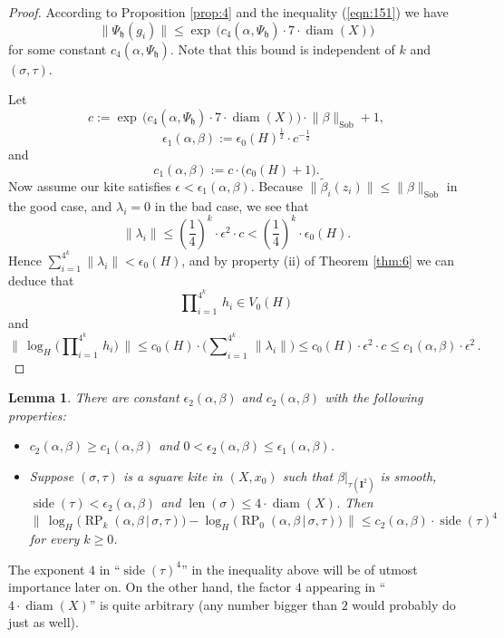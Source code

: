 \documentclass[10pt, a4paper]{amsart}
\newtheorem{lem}[equation]{Lemma}
\theoremstyle{definition}
\numberwithin{equation}{section}
\newcommand{\opn}{\operatorname}
\newcommand{\rmitem}[1]{\item[\text{\textup{(#1)}}]}
\newcommand{\mfrak}[1]{\mathfrak{#1}}
\newcommand{\mbf}[1]{\mathbf{#1}}
\newcommand{\mrm}[1]{\mathrm{#1}}
\newcommand{\smfrac}[2]{{\textstyle \frac{#1}{#2}}}
\newcommand{\til}[1]{\tilde{#1}}
\newcommand{\norm}[1]{\lVert #1 \rVert}
\newcommand{\Norm}[1]{\bigl\lVert\, #1 \, \bigr\rVert}
\renewcommand{\vert}{\, | \,}
\newcommand{\h}{\mfrak{h}}
\begin{document}
\begin{proof}
According to Proposition \ref{prop:4} and the inequality (\ref{eqn:151})
we have 
\[ \norm{\Psi_{\h}(g_i)} \leq 
\exp \, \bigl( c_4(\alpha, \Psi_{\h}) \cdot
7 \cdot \opn{diam}(X) \bigr)  \]
for some constant $c_4(\alpha, \Psi_{\h})$. Note that this bound is
independent of $k$ and $(\sigma, \tau)$.

Let
\[ c := \exp \, \bigl( c_4(\alpha, \Psi_{\h}) \cdot
7 \cdot \opn{diam}(X) \bigr) \cdot  \norm{\beta}_{\mrm{Sob}} + 1 , \]
\[ \epsilon_1(\alpha, \beta) := \epsilon_0(H)^{\smfrac{1}{2}}  
\cdot c^{-\smfrac{1}{2}}  \]
and
\[ c_1(\alpha, \beta) := c \cdot \bigl( c_0(H) + 1 \bigr) . \]
Now assume our kite satisfies $\epsilon < \epsilon_1(\alpha, \beta)$. 
Because 
$\norm{\til{\beta}_i(z_i)} \leq \norm{\beta}_{\mrm{Sob}}$
in the good case, and $\lambda_i = 0$ in the bad case, we see that 
\begin{equation*} \label{eqn:104}
\norm{\lambda_i} \leq (\smfrac{1}{4})^k \cdot \epsilon^2 \cdot c
< (\smfrac{1}{4})^k \cdot \epsilon_0(H) .
\end{equation*}
Hence 
$\sum_{i = 1}^{4^k} \norm{\lambda_i} < \epsilon_0(H)$, 
and by property (ii) of Theorem \ref{thm:6} we can deduce that
\[ \prod\nolimits_{i = 1}^{4^k} \, h_i \in V_0(H) \]
and
\[ \Norm{ \log_H \bigl( \prod\nolimits_{i = 1}^{4^k} \, h_i \bigr) }
\leq c_0(H) \cdot \bigl( \sum\nolimits_{i = 1}^{4^k} \, \norm{\lambda_i} \bigr)
\leq c_0(H) \cdot \epsilon^2 \cdot c 
\leq c_1(\alpha, \beta) \cdot \epsilon^2 \, . \]
\end{proof}

\begin{lem} \label{lem:5}
There are constant $\epsilon_2(\alpha, \beta)$ and
$c_2(\alpha, \beta)$ with the following properties:
\begin{itemize}
\rmitem{i} $c_2(\alpha, \beta) \geq c_1(\alpha, \beta)$ and
$0 < \epsilon_2(\alpha, \beta) \leq \epsilon_1(\alpha, \beta)$.
%
\rmitem{ii} Suppose $(\sigma, \tau)$ is a square kite in $(X, x_0)$ such that 
$\beta|_{\tau(\mbf{I}^{2})}$ is smooth,
$\opn{side}(\tau) < \epsilon_2(\alpha, \beta)$ and
$\opn{len}(\sigma) \leq 4 \cdot \opn{diam}(X)$. Then 
\[ \Norm{ \opn{log}_H \bigl( \opn{RP}_{k}(\alpha, \beta \vert \sigma, \tau)
\bigr) -
\opn{log}_H \bigl( \opn{RP}_{0}(\alpha, \beta \vert \sigma, \tau)
\bigr) } \leq 
c_2(\alpha, \beta) \cdot \opn{side}(\tau)^4  \]
for every $k \geq 0$.
\end{itemize}
\end{lem}

The exponent $4$ in ``$\opn{side}(\tau)^4$'' in the inequality above will be of
utmost importance later on. On the other hand, the factor $4$ appearing in
``$4 \cdot \opn{diam}(X)$'' is quite arbitrary (any number bigger than $2$ would
probably do just as well). 
\end{document}
